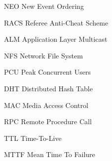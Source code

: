 \begin{Nomencl}[\gnat]
        \item[NEO]      New Event Ordering
        \item[RACS]     Referee Anti-Cheat Scheme
        \item[ALM]      Application Layer Multicast
        \item[NFS]      Network File System
        \item[PCU]      Peak Concurrent Users
        \item[DHT]      Distributed Hash Table
        \item[MAC]      Media Access Control
        \item[RPC]      Remote Procedure Call
        \item[TTL]      Time-To-Live
        \item[MTTF]     Mean Time To Failure
\end{Nomencl}
\endinput
